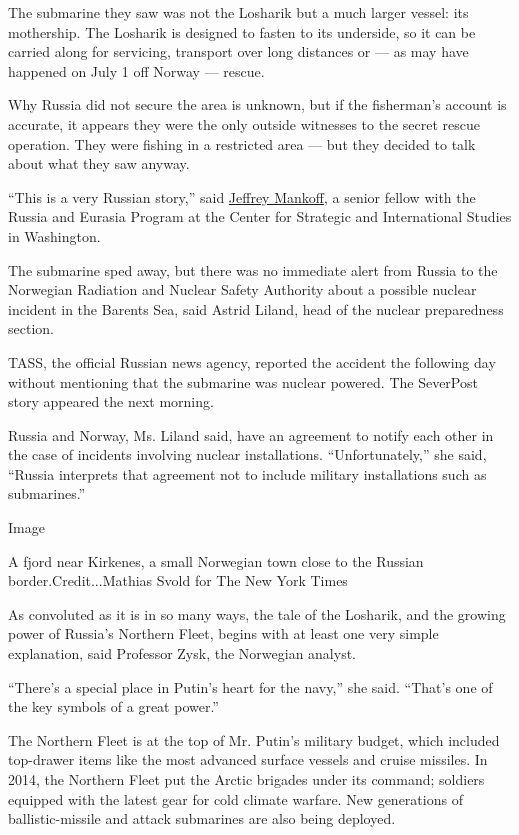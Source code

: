 The submarine they saw was not the Losharik but a much larger vessel:
its mothership. The Losharik is designed to fasten to its underside, so
it can be carried along for servicing, transport over long distances or
--- as may have happened on July 1 off Norway --- rescue.

Why Russia did not secure the area is unknown, but if the fisherman's
account is accurate, it appears they were the only outside witnesses to
the secret rescue operation. They were fishing in a restricted area ---
but they decided to talk about what they saw anyway.

``This is a very Russian story,'' said
\href{https://www.csis.org/people/jeffrey-mankoff}{Jeffrey Mankoff}, a
senior fellow with the Russia and Eurasia Program at the Center for
Strategic and International Studies in Washington.

The submarine sped away, but there was no immediate alert from Russia to
the Norwegian Radiation and Nuclear Safety Authority about a possible
nuclear incident in the Barents Sea, said Astrid Liland, head of the
nuclear preparedness section.

TASS, the official Russian news agency, reported the accident the
following day without mentioning that the submarine was nuclear powered.
The SeverPost story appeared the next morning.

Russia and Norway, Ms. Liland said, have an agreement to notify each
other in the case of incidents involving nuclear installations.
``Unfortunately,'' she said, ``Russia interprets that agreement not to
include military installations such as submarines.''

Image

A fjord near Kirkenes, a small Norwegian town close to the Russian
border.Credit...Mathias Svold for The New York Times

As convoluted as it is in so many ways, the tale of the Losharik, and
the growing power of Russia's Northern Fleet, begins with at least one
very simple explanation, said Professor Zysk, the Norwegian analyst.

``There's a special place in Putin's heart for the navy,'' she said.
``That's one of the key symbols of a great power.''

The Northern Fleet is at the top of Mr. Putin's military budget, which
included top-drawer items like the most advanced surface vessels and
cruise missiles. In 2014, the Northern Fleet put the Arctic brigades
under its command; soldiers equipped with the latest gear for cold
climate warfare. New generations of ballistic-missile and attack
submarines are also being deployed.

